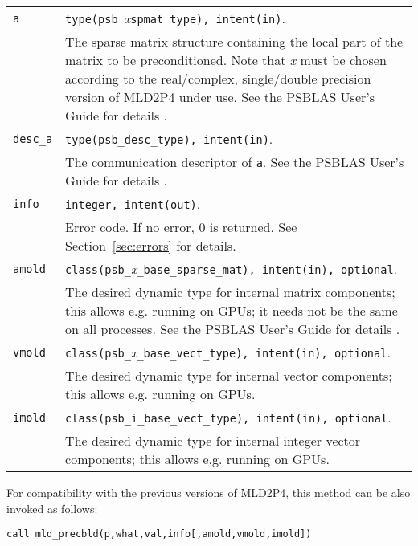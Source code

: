 \begin{tabular}{p{1.2cm}p{12cm}}
\verb|a|  & \verb|type(psb_|\emph{x}\verb|spmat_type), intent(in)|. \\
              & The sparse matrix structure containing the local part of the
                matrix to be preconditioned. Note that \emph{x} must be chosen according
                to the real/complex, single/double precision version of MLD2P4 under use.
                See the PSBLAS User's Guide for details \cite{PSBLASGUIDE}.\\
\verb|desc_a| & \verb|type(psb_desc_type), intent(in)|. \\
              & The communication descriptor of \verb|a|. See the PSBLAS User's Guide for
                details \cite{PSBLASGUIDE}.\\
\verb|info|   & \verb|integer, intent(out)|.\\
              & Error code. If no error, 0 is returned. See Section~\ref{sec:errors} for details.\\
\verb|amold| & \verb|class(psb_|\emph{x}\verb|_base_sparse_mat), intent(in), optional|. \\
 & The desired dynamic type for internal matrix
  components; this allows e.g. running on GPUs; it needs not be the
  same on all processes. See the PSBLAS User's Guide for
  details \cite{PSBLASGUIDE}. \\
  \verb|vmold| & \verb|class(psb_|\emph{x}\verb|_base_vect_type), intent(in), optional|. \\
  & The desired dynamic type for internal vector
  components; this allows e.g. running on GPUs. \\
  \verb|imold| & \verb|class(psb_i_base_vect_type), intent(in), optional|. \\
  & The desired dynamic type for internal integer vector
  components; this allows e.g. running on GPUs. \\
\end{tabular}

\baselineskip
For compatibility with the previous versions of MLD2P4, this method can be also invoked
as follows:

\begin{center}
\verb|call mld_precbld(p,what,val,info[,amold,vmold,imold])|
\end{center}

